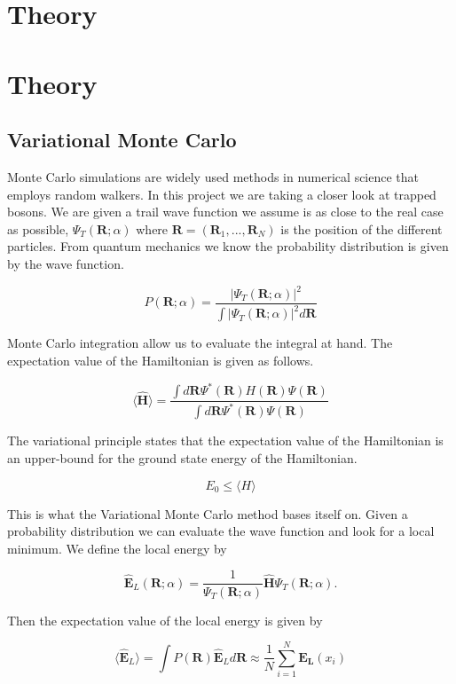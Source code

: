 \section{Theory}

\section{Theory}

\subsection{Variational Monte Carlo}

Monte Carlo simulations are widely used methods in numerical science that employs random walkers. 
In this project we are taking a closer look at trapped bosons. We are given a trail wave function we assume is as close to the real case as possible, $\Psi_T(\mathbf{R};\alpha)$ where $\mathbf{R} = (\mathbf{R}_1, ... , \mathbf{R}_N)$ is the position of the different particles. 
From quantum mechanics we know the probability distribution is given by the wave function. 

$$P(\mathbf{R}; \alpha) = \frac{|\Psi_T(\mathbf{R};\alpha)|^2}{\int |\Psi_T(\mathbf{R};\alpha)|^2 d\mathbf{R}}$$

Monte Carlo integration allow us to evaluate the integral at hand. The expectation value of the Hamiltonian is given as follows. 

$$\langle \widehat{\mathbf{H}}\rangle = \frac{\int d \mathbf{R} \Psi^{\ast} (\mathbf{R})H(\mathbf{R}) \Psi(\mathbf{R})}{\int d \mathbf{R} \Psi^{\ast} (\mathbf{R}) \Psi(\mathbf{R})}$$

The variational principle states that the expectation value of the Hamiltonian is an upper-bound for the ground state energy of the Hamiltonian.

$$E_0 \leq \langle H \rangle$$

This is what the Variational Monte Carlo method bases itself on. Given a probability distribution we can evaluate the wave function and look for a local minimum. We define the local energy by

$$\widehat{\mathbf{E}}_L(\mathbf{R};\alpha) = \frac{1}{\Psi_T(\mathbf{R};\alpha)}\widehat{\mathbf{H}}\Psi_T(\mathbf{R};\alpha).$$

Then the expectation value of the local energy is given by

$$\langle \widehat{\mathbf{E}}_L\rangle = \int P(\mathbf{R}) \widehat{\mathbf{E}}_L d\mathbf{R} \approx \frac{1}{N} \sum_{i = 1}^N \mathbf{E_L}(x_i)$$

